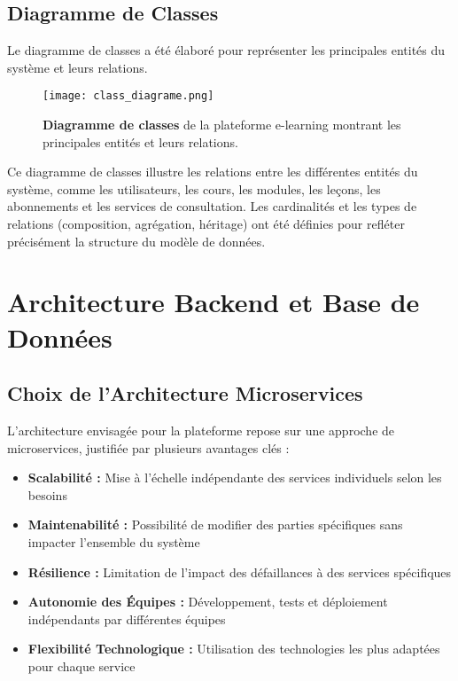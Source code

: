 \subsection{Diagramme de Classes}
Le diagramme de classes a été élaboré pour représenter les principales entités du système et leurs relations.

\begin{figure}[h!]
  \centering
  \texttt{[image: class\_diagrame.png]}
  \caption{\textbf{Diagramme de classes} de la plateforme e-learning montrant les principales entités et leurs relations.}
  \label{fig:class_diagram}
\end{figure}

Ce diagramme de classes illustre les relations entre les différentes entités du système, comme les utilisateurs, les cours, les modules, les leçons, les abonnements et les services de consultation. Les cardinalités et les types de relations (composition, agrégation, héritage) ont été définies pour refléter précisément la structure du modèle de données.

\section{Architecture Backend et Base de Données}

\subsection{Choix de l'Architecture Microservices}
L'architecture envisagée pour la plateforme repose sur une approche de microservices, justifiée par plusieurs avantages clés :
\begin{itemize}
  \item \textbf{Scalabilité :} Mise à l'échelle indépendante des services individuels selon les besoins
  \item \textbf{Maintenabilité :} Possibilité de modifier des parties spécifiques sans impacter l'ensemble du système
  \item \textbf{Résilience :} Limitation de l'impact des défaillances à des services spécifiques
  \item \textbf{Autonomie des Équipes :} Développement, tests et déploiement indépendants par différentes équipes
  \item \textbf{Flexibilité Technologique :} Utilisation des technologies les plus adaptées pour chaque service
\end{itemize}

